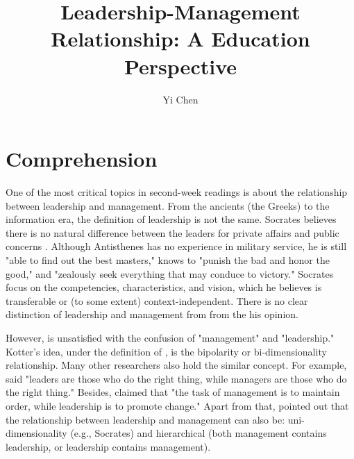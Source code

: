 \documentclass[doc,biblatex,apacite]{apa6}
\author{Yi Chen}
\affiliation{Teachers College, Columbia University}
\title{Leadership-Management Relationship: A Education Perspective}
\begin{document}
\maketitle

\section{Comprehension}

One of the most critical topics in second-week readings is about the relationship between leadership and management. 
From the ancients (the Greeks) to the information era, the definition of leadership is not the same. 
Socrates believes there is no natural difference between the leaders for private affairs and public concerns \cite{XenophontransJ.S.Watson1875}.
Although Antisthenes has no experience in military service, he is still "able to find out the best masters," knows to "punish the bad and honor the good," and "zealously seek everything that may conduce to victory."
Socrates focus on the competencies, characteristics, and vision, which he believes is transferable or (to some extent) context-independent.
There is no clear distinction of leadership and management from from the his opinion.

However,  is unsatisfied with the confusion of "management" and "leadership."
Kotter's idea, under the definition of , is the bipolarity or bi-dimensionality relationship.
Many other researchers also hold the similar concept.
For example,  said "leaders are those who do the right thing, while managers are those who do the right thing."
Besides,  claimed that "the task of management is to maintain order, while leadership is to promote change."
Apart from that,  pointed out that the relationship between leadership and management can also be: uni-dimensionality (e.g., Socrates) and hierarchical (both management contains leadership, or leadership contains management).
\end{document}
